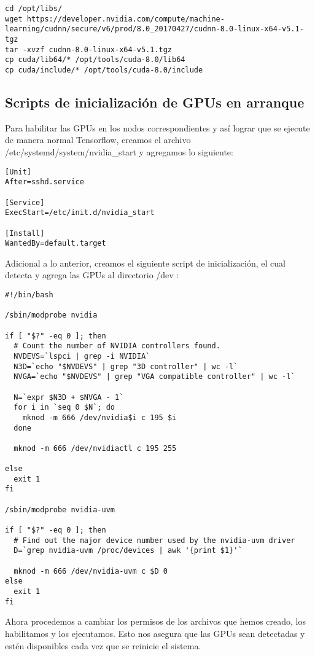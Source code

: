 \begin{lstlisting}
cd /opt/libs/
wget https://developer.nvidia.com/compute/machine-learning/cudnn/secure/v6/prod/8.0_20170427/cudnn-8.0-linux-x64-v5.1-tgz
tar -xvzf cudnn-8.0-linux-x64-v5.1.tgz
cp cuda/lib64/* /opt/tools/cuda-8.0/lib64
cp cuda/include/* /opt/tools/cuda-8.0/include
\end{lstlisting}


\subsection{Scripts de inicialización de GPUs en arranque}

Para habilitar las GPUs en los nodos correspondientes y así lograr que se ejecute de manera normal Tensorflow, creamos el archivo /etc/systemd/system/nvidia\_start y agregamos lo siguiente:

\begin{lstlisting}
[Unit]
After=sshd.service

[Service]
ExecStart=/etc/init.d/nvidia_start

[Install]
WantedBy=default.target
\end{lstlisting}

Adicional a lo anterior, creamos el siguiente script de inicialización, el cual detecta y agrega las GPUs al directorio /dev \cite{gpufix}:

\begin{lstlisting}
#!/bin/bash

/sbin/modprobe nvidia

if [ "$?" -eq 0 ]; then
  # Count the number of NVIDIA controllers found.
  NVDEVS=`lspci | grep -i NVIDIA`
  N3D=`echo "$NVDEVS" | grep "3D controller" | wc -l`
  NVGA=`echo "$NVDEVS" | grep "VGA compatible controller" | wc -l`

  N=`expr $N3D + $NVGA - 1`
  for i in `seq 0 $N`; do
    mknod -m 666 /dev/nvidia$i c 195 $i
  done

  mknod -m 666 /dev/nvidiactl c 195 255

else
  exit 1
fi

/sbin/modprobe nvidia-uvm

if [ "$?" -eq 0 ]; then
  # Find out the major device number used by the nvidia-uvm driver
  D=`grep nvidia-uvm /proc/devices | awk '{print $1}'`

  mknod -m 666 /dev/nvidia-uvm c $D 0
else
  exit 1
fi
\end{lstlisting}

Ahora procedemos a cambiar los permisos de los archivos que hemos creado, los habilitamos y los ejecutamos. Esto nos asegura que las GPUs sean detectadas y estén disponibles cada vez que se reinicie el sistema.


